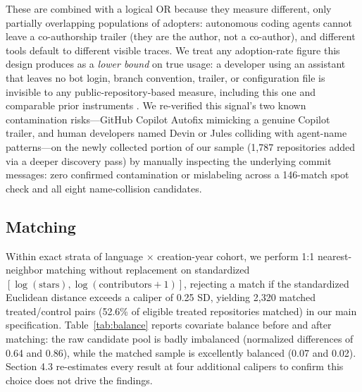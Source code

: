 \documentclass[12pt]{article}
\begin{document}
These are combined with a logical OR because they measure different,
only partially overlapping populations of adopters: autonomous coding
agents cannot leave a co-authorship trailer (they are the author, not a
co-author), and different tools default to different visible traces. We
treat any adoption-rate figure this design produces as a \emph{lower
bound} on true usage: a developer using an assistant that leaves no bot
login, branch convention, trailer, or configuration file is invisible to
any public-repository-based measure, including this one and comparable
prior instruments \cite{he2026cursor,robbes2026agentic}. We re-verified
this signal's two known contamination risks---GitHub Copilot Autofix
mimicking a genuine Copilot trailer, and human developers named Devin or
Jules colliding with agent-name patterns---on the newly collected portion
of our sample (1,787 repositories added via a deeper discovery pass) by
manually inspecting the underlying commit messages: zero confirmed
contamination or mislabeling across a 146-match spot check and all eight
name-collision candidates.

\subsection{Matching}

Within exact strata of language $\times$ creation-year cohort, we perform
1:1 nearest-neighbor matching without replacement on standardized
$[\log(\text{stars}), \log(\text{contributors}+1)]$, rejecting a match if
the standardized Euclidean distance exceeds a caliper of 0.25 SD, yielding
2,320 matched treated/control pairs (52.6\% of eligible treated
repositories matched) in our main specification. Table~\ref{tab:balance}
reports covariate balance before and after matching: the raw candidate
pool is badly imbalanced (normalized differences of 0.64 and 0.86), while
the matched sample is excellently balanced (0.07 and 0.02). Section 4.3
re-estimates every result at four additional calipers to confirm this
choice does not drive the findings.
\end{document}
